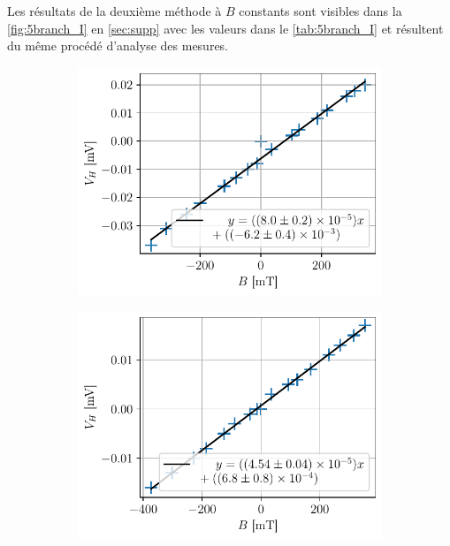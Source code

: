 Les résultats de la deuxième méthode à \(B\) constants sont visibles dans la \autoref{fig:5branch_I} en \autoref{sec:supp} avec les valeurs dans le \autoref{tab:5branch_I} et résultent du même procédé d'analyse des mesures.

\begin{figure}[h]
    \centering
    \begin{subfigure}{0.5\textwidth}
        \includegraphics[width=\linewidth]{figures/Ag_B.pdf}
        \caption{}
        \label{fig:Ag_B}
    \end{subfigure}%
    \begin{subfigure}{0.5\textwidth}
        \includegraphics[width=\linewidth]{figures/Cu_B.pdf}
        \caption{}

\end{subfigure}
\end{figure}
